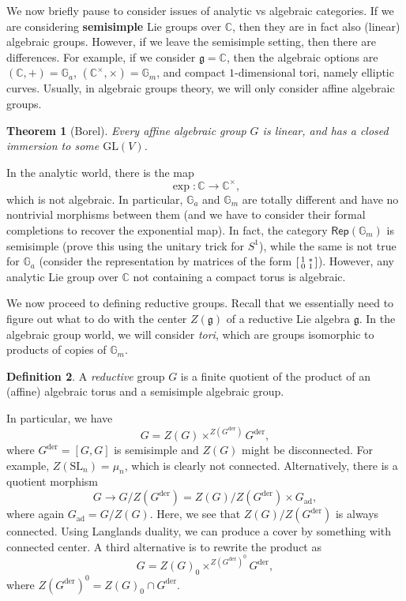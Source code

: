 \documentclass{amsart}
\newtheorem{thm}{Theorem}[section]
\theoremstyle{definition}
\newtheorem{defn}[thm]{Definition}
\theoremstyle{remark}
\theoremstyle{plain}
\theoremstyle{definition}
\theoremstyle{remark}
\newcommand{\G}{\mathbb{G}}
\newcommand{\C}{\mathbb{C}}
\newcommand{\g}{\mathfrak{g}}
\newcommand{\mr}[1]{\mathrm{#1}}
\newcommand{\on}[1]{\operatorname{#1}}
\newcommand{\ms}[1]{\mathsf{#1}}
\newcommand{\1}{\mathbf{1}}
\newcommand{\2}{\mathbf{2}}
\newcommand{\3}{\mathbf{3}}
\newcommand{\GL}{\mr{GL}}
\newcommand{\SL}{\mr{SL}}
\DeclareMathOperator{\ad}{ad}
\begin{document}
We now briefly pause to consider issues of analytic vs algebraic categories. If we are considering \textbf{semisimple} Lie groups over \(\C\), then they are in fact also (linear) algebraic groups. However, if we leave the semisimple setting, then there are differences. For example, if we consider \(\g = \C\), then the algebraic options are \((\C, +) = \G_a\), \((\C^{\times}, \times) = \G_m\), and compact \(1\)-dimensional tori, namely elliptic curves. Usually, in algebraic groups theory, we will only consider affine algebraic groups.

\begin{thm}[Borel]
    Every affine algebraic group \(G\) is linear, and has a closed immersion to some \(\GL(V)\).
\end{thm}


In the analytic world, there is the map
\[ \exp \colon \C \to \C^{\times}, \]
which is not algebraic. In particular, \(\G_a\) and \(\G_m\) are totally different and have no nontrivial morphisms between them (and we have to consider their formal completions to recover the exponential map). In fact, the category \(\ms{Rep}(\G_m)\) is semisimple (prove this using the unitary trick for \(S^1\)), while the same is not true for \(\G_a\) (consider the representation by matrices of the form \(\begin{bsmallmatrix}
    1 & * \\
    0 & 1
\end{bsmallmatrix}\)). However, any analytic Lie group over \(\C\) not containing a compact torus is algebraic.


We now proceed to defining reductive groups. Recall that we essentially need to figure out what to do with the center \(Z(\g)\) of a reductive Lie algebra \(\g\). In the algebraic group world, we will consider \textit{tori}, which are groups isomorphic to products of copies of \(\G_m\).

\begin{defn}
    A \textit{reductive} group \(G\) is a finite quotient of the product of an (affine) algebraic torus and a semisimple algebraic group.
\end{defn}

In particular, we have
\[ G = Z(G) \times^{Z(G^{\on{der}})} G^{\on{der}}, \]
where \(G^{\on{der}} = [G,G]\) is semisimple and \(Z(G)\) might be disconnected. For example, \(Z(\SL_n) = \mu_n\), which is clearly not connected. Alternatively, there is a quotient morphism
\[ G \to G / Z(G^{\on{der}}) = Z(G) / Z(G^{\on{der}}) \times G_{\ad}, \]
where again \(G_{\ad}= G/Z(G)\). Here, we see that \(Z(G)/Z(G^{\on{der}})\) is always connected. Using Langlands duality, we can produce a cover by something with connected center. A third alternative is to rewrite the product as
\[ G = Z(G)_0 \times^{Z{(G^{\on{der}})}^{0}} G^{\on{der}}, \]
where \(Z{(G^{\on{der}})}^{0} = Z(G)_0 \cap G^{\on{der}}\).
\end{document}

